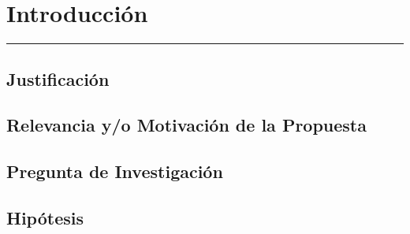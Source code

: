 \chapter{Introducción}
\hrule \bigskip \vspace*{1cm}

\section{Justificación} 


\section{Relevancia y/o Motivación de la Propuesta}



\section{Pregunta de Investigación}







\section{Hipótesis}



